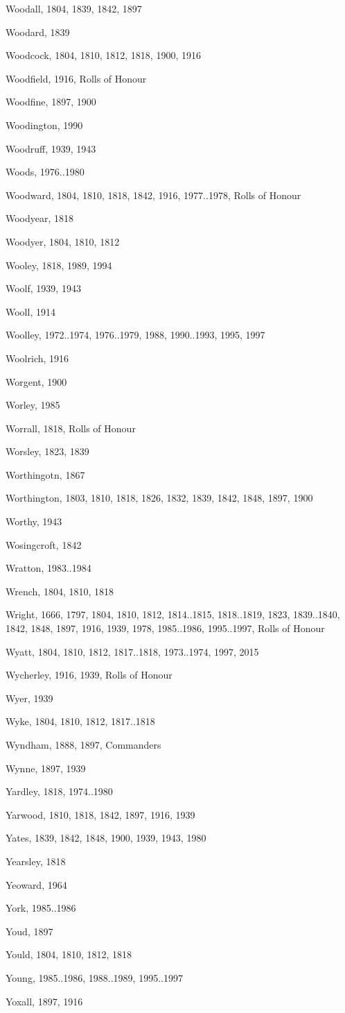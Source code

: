 \begin{theindex}
\item Woodall, 1804, 1839, 1842, 1897
\item Woodard, 1839
\item Woodcock, 1804, 1810, 1812, 1818, 1900, 1916
\item Woodfield, 1916, Rolls of Honour
\item Woodfine, 1897, 1900
\item Woodington, 1990
\item Woodruff, 1939, 1943
\item Woods, 1976..1980
\item Woodward, 1804, 1810, 1818, 1842, 1916, 1977..1978, Rolls of Honour
\item Woodyear, 1818
\item Woodyer, 1804, 1810, 1812
\item Wooley, 1818, 1989, 1994
\item Woolf, 1939, 1943
\item Wooll, 1914
\item Woolley, 1972..1974, 1976..1979, 1988, 1990..1993, 1995, 1997
\item Woolrich, 1916
\item Worgent, 1900
\item Worley, 1985
\item Worrall, 1818, Rolls of Honour
\item Worsley, 1823, 1839
\item Worthingotn, 1867
\item Worthington, 1803, 1810, 1818, 1826, 1832, 1839, 1842, 1848, 1897, 1900
\item Worthy, 1943
\item Wosingcroft, 1842
\item Wratton, 1983..1984
\item Wrench, 1804, 1810, 1818
\item Wright, 1666, 1797, 1804, 1810, 1812, 1814..1815, 1818..1819, 1823, 1839..1840, 1842, 1848, 1897, 1916, 1939, 1978, 1985..1986, 1995..1997, Rolls of Honour
\item Wyatt, 1804, 1810, 1812, 1817..1818, 1973..1974, 1997, 2015
\item Wycherley, 1916, 1939, Rolls of Honour
\item Wyer, 1939
\item Wyke, 1804, 1810, 1812, 1817..1818
\item Wyndham, 1888, 1897, Commanders
\item Wynne, 1897, 1939
\item Yardley, 1818, 1974..1980
\item Yarwood, 1810, 1818, 1842, 1897, 1916, 1939
\item Yates, 1839, 1842, 1848, 1900, 1939, 1943, 1980
\item Yearsley, 1818
\item Yeoward, 1964
\item York, 1985..1986
\item Youd, 1897
\item Yould, 1804, 1810, 1812, 1818
\item Young, 1985..1986, 1988..1989, 1995..1997
\item Yoxall, 1897, 1916
\end{theindex}
